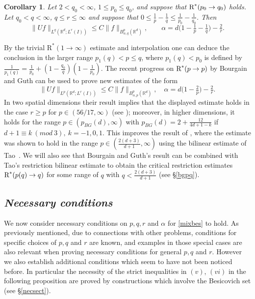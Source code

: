 \documentclass[11pt]{amsart}
\newtheorem{corollary}[theorem]{Corollary}
\theoremstyle{definition}
\numberwithin{theorem}{section}
\numberwithin{definition}{section}
\numberwithin{equation}{section}
\renewcommand{\le}{\leqslant}
\renewcommand{\ge}{\geqslant}
\def\bbR{{\mathbb {R}}}
\renewcommand{\le}{\leqslant}
\renewcommand{\ge}{\geqslant}
\begin{document}
\begin{corollary}\label{SobCor2} Let $2<q_0<\infty$, $1\le p_0\le q_0$, and suppose that
$\text{\rm R}^*(p_0\to q_0)$ holds. Let $q_0<q<\infty$, $q\le r\le \infty$
and suppose that $0\le \frac{1}{p}-\frac{1}{q}\le
\frac{1}{p_0}-\frac{1}{q_0}$.
 Then $$
\|Uf\|_{L^q(\bbR^{d};L^r(I))}\le C\|f\|_{B^p_{\alpha,q}(\bbR^d)},
\qquad \alpha= d\big(1-\tfrac 1p-\tfrac 1q\big)-\tfrac 2r.
$$
\end{corollary}
By the  trivial $\text{R}^*(1\to\infty)$ estimate and interpolation
one can deduce the conclusion in the larger  range $p_1(q)<p\le q$,
where $p_1(q)<p_0$ is defined by $\frac{1}{p_1(q)}=
\frac{1}{p_0}+(1-\frac {q_0}{q})(1-\frac 1{p_0})$.
%
The
recent progress on $\text{\rm R}^*(p\to p)$
by Bourgain and
Guth \cite{bogu} can  be used to prove new estimates of the form
\begin{equation*}\label{mixbes2}
\|Uf\|_{L^{p}(\bbR^d;L^r(I))}\le
C\|f\|_{B^p_{\alpha,p}(\bbR^d)},\quad \alpha=d\big(1-\tfrac
{2}p\big)-\tfrac 2r.
\end{equation*}
In two spatial dimensions their result implies that the displayed
estimate holds in the case $r\ge p$ for $p\in(56/17,\infty)$ (see
\cite[pp. 1265]{bogu}); moreover, in higher dimensions, it holds for
the range $p\in(p_{BG}(d),\infty)$ with $p_{BG}(d)=2+
\frac{12}{4d+1-k} $ if $ d+1\equiv k ~(mod~ 3),\ k=-1, 0,1$. This
improves the result of \cite{rose}, where the estimate was shown to
hold in the range $p\in(\frac{2(d+3)}{d+1},\infty)$ using the
bilinear estimate of Tao~\cite{ta}. We will also see that Bourgain
and Guth's result can be combined with Tao's restriction bilinear
estimate to obtain the critical restriction estimates $\text{\rm R}^*(p(q)\to q)$  for
some range of
 $q$ with $q<\tfrac{2(d+3)}{d+1}$ (see
\S \ref{bgpq}).


\subsection*{\it Necessary conditions} We now consider  necessary conditions on $p,q,r$ and $\alpha$ for  \eqref{mixbes} to hold.   As previously mentioned,  due to connections with  other  problems,
 conditions  for  specific choices  of $p,q$ and $r$ are known, and
examples in those  special cases are also relevant when proving
necessary conditions for general  $p,q$ and $r$. However we also
establish additional   conditions which seem to have not been
noticed before. In particular the  necessity of the strict
inequalities in $(v)$, $(vi)$ in the following proposition
 are proved by constructions which involve the
Besicovich set (see \S\ref{necsect}).
\end{document}
